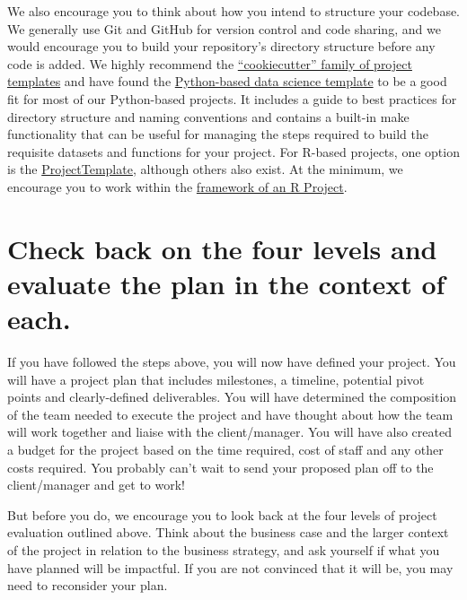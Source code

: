 \documentclass[
]{book}
\begin{document}
We also encourage you to think about how you intend to structure your codebase. We generally use Git and GitHub for version control and code sharing, and we would encourage you to build your repository's directory structure before any code is added. We highly recommend the \href{https://github.com/cookiecutter/cookiecutter}{``cookiecutter'' family of project templates} and have found the \href{http://drivendata.github.io/cookiecutter-data-science/}{Python-based data science template} to be a good fit for most of our Python-based projects. It includes a guide to best practices for directory structure and naming conventions and contains a built-in make functionality that can be useful for managing the steps required to build the requisite datasets and functions for your project. For R-based projects, one option is the \href{http://projecttemplate.net/}{ProjectTemplate}, although others also exist. At the minimum, we encourage you to work within the \href{https://support.rstudio.com/hc/en-us/articles/200526207-Using-Projects}{framework of an R Project}.

\hypertarget{check-back-on-the-four-levels-and-evaluate-the-plan-in-the-context-of-each.}{%
\section{Check back on the four levels and evaluate the plan in the context of each.}\label{check-back-on-the-four-levels-and-evaluate-the-plan-in-the-context-of-each.}}

If you have followed the steps above, you will now have defined your project. You will have a project plan that includes milestones, a timeline, potential pivot points and clearly-defined deliverables. You will have determined the composition of the team needed to execute the project and have thought about how the team will work together and liaise with the client/manager. You will have also created a budget for the project based on the time required, cost of staff and any other costs required. You probably can't wait to send your proposed plan off to the client/manager and get to work!

But before you do, we encourage you to look back at the four levels of project evaluation outlined above. Think about the business case and the larger context of the project in relation to the business strategy, and ask yourself if what you have planned will be impactful. If you are not convinced that it will be, you may need to reconsider your plan.
\end{document}
